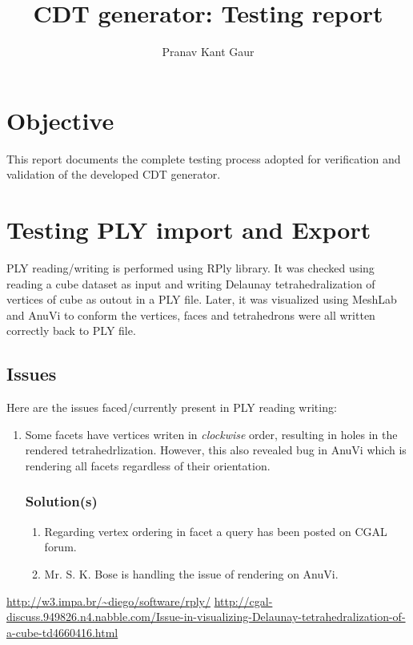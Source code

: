 \documentclass{article}
\begin{document}
\title{CDT generator: Testing report}
\author{Pranav Kant Gaur}
\maketitle

\section{Objective}
This report documents the complete testing process adopted for verification and validation of the developed CDT generator.

\section{Testing PLY import and Export}
PLY reading/writing is performed using RPly\cite{rply} library. It was checked using reading a cube dataset as input and writing Delaunay tetrahedralization of vertices of cube as outout in a PLY file. Later, it was visualized using MeshLab and AnuVi to conform the vertices, faces and tetrahedrons were all written correctly back to PLY file.

\subsection{Issues}
Here are the issues faced/currently present in PLY reading writing:
\begin{enumerate}
	\item Some facets have vertices writen in \textit{clockwise} order, resulting in holes in the rendered tetrahedrlization. However, this also revealed bug in AnuVi which is rendering all facets regardless of their orientation.
		\subsubsection{Solution(s)}
		\begin{enumerate}
			\item Regarding vertex ordering in facet a query\cite{cgalForumMessage1} has been posted on CGAL forum.
		\item Mr. S. K. Bose is handling the issue of rendering on AnuVi.	
		\end{enumerate}

\end{enumerate}		




\begin{thebibliography}{1}
\url{http://w3.impa.br/~diego/software/rply/}	
\url{http://cgal-discuss.949826.n4.nabble.com/Issue-in-visualizing-Delaunay-tetrahedralization-of-a-cube-td4660416.html}	

\end{thebibliography}
\end{document}
